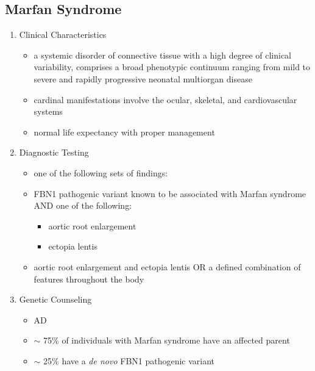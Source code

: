 \documentclass[12pt]{scrartcl}
\begin{document}
\subsection{Marfan Syndrome}
\label{sec:orga6082de}
\begin{enumerate}
\item Clinical Characteristics
\label{sec:org84b66d3}
\begin{itemize}
\item a systemic disorder of connective tissue with a high degree of
clinical variability, comprises a broad phenotypic continuum ranging
from mild to severe and rapidly progressive neonatal multiorgan
disease
\item cardinal manifestations involve the ocular, skeletal, and
cardiovascular systems
\item normal life expectancy with proper management
\end{itemize}
\item Diagnostic Testing
\label{sec:org88c8cf9}
\begin{itemize}
\item one of the following sets of findings:

\item FBN1 pathogenic variant known to be associated with Marfan syndrome
AND one of the following:
\begin{itemize}
\item aortic root enlargement
\item ectopia lentis
\end{itemize}
\item aortic root enlargement and ectopia lentis OR a
defined combination of features throughout the body
\end{itemize}

\item Genetic Counseling
\label{sec:org9375f55}
\begin{itemize}
\item AD
\item \(\sim\) 75\% of individuals with Marfan syndrome have an affected
parent
\item \(\sim\) 25\% have a \emph{de novo} FBN1 pathogenic variant
\end{itemize}
\end{enumerate}
\end{document}
